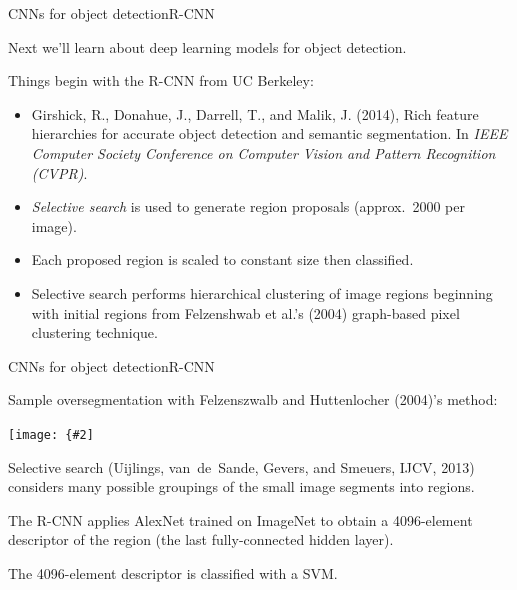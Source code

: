 \documentclass[aspectratio=169]{beamer}
\newcommand{\myfig}[3]{\centerline{\texttt{[image: \{\#2]}}}
\begin{document}
\begin{frame}{CNNs for object detection}{R-CNN}

  Next we'll learn about deep learning models for object detection.

  \medskip

  Things begin with the \alert{R-CNN} from UC Berkeley:
  \begin{itemize}
  \item Girshick, R., Donahue, J., Darrell, T., and Malik, J. (2014),
    Rich feature hierarchies for accurate object detection and
    semantic segmentation. In \textit{IEEE Computer Society Conference
      on Computer Vision and Pattern Recognition (CVPR)}.
  \item \textit{Selective search} is used to generate region proposals
    (approx.\ 2000 per image).
  \item Each proposed region is scaled to constant size then classified.
  \item Selective search performs hierarchical clustering of image
    regions beginning with initial regions from Felzenshwab et al.'s
    (2004) graph-based pixel clustering technique.
  \end{itemize}
  
\end{frame}


\begin{frame}{CNNs for object detection}{R-CNN}

  Sample oversegmentation with Felzenszwalb and Huttenlocher (2004)'s
  method:

  \medskip

  \myfig{3in}{felz-seg}{Felzenszwalb and Huttenlocher (2004), Fig. 4}

  \medskip

  Selective search (Uijlings, van~de~Sande, Gevers, and Smeuers, IJCV,
  2013) considers many possible groupings of the small image segments
  into regions.

  \medskip

  The R-CNN applies AlexNet trained on ImageNet to obtain a
  4096-element descriptor of the region (the last fully-connected
  hidden layer).

  \medskip

  The 4096-element descriptor is classified with a SVM.

\end{frame}
\end{document}
